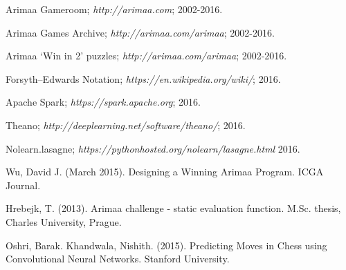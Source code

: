 \documentclass{article}
\begin{document}
\begin{thebibliography}{9}

Arimaa Gameroom;
\textit{http://arimaa.com};
2002-2016.

Arimaa Games Archive;
\textit{http://arimaa.com/arimaa};
2002-2016.

Arimaa `Win in 2' puzzles;
\textit{http://arimaa.com/arimaa};
2002-2016.

Forsyth--Edwards Notation;
\textit{https://en.wikipedia.org/wiki/};
2016.

Apache Spark;
\textit{https://spark.apache.org};
2016.

Theano;
\textit{http://deeplearning.net/software/theano/};
2016.

Nolearn.lasagne;
\textit{https://pythonhosted.org/nolearn/lasagne.html}
2016.

Wu, David J. (March 2015).
Designing a Winning Arimaa Program.
ICGA Journal.

Hrebejk, T. (2013). Arimaa challenge - static evaluation function. M.Sc. thesis, Charles University, Prague.

Oshri, Barak. Khandwala, Nishith. (2015).  Predicting Moves in Chess using Convolutional Neural Networks.  Stanford University.

\end{thebibliography}
\end{document}
